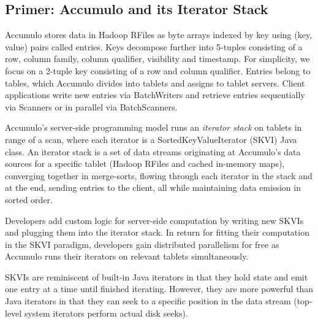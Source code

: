 





\subsection{Primer: Accumulo and its Iterator Stack}
\label{sAccumuloIterators}
Accumulo stores data in Hadoop RFiles as byte arrays indexed by key using (key, value) pairs called entries.
Keys decompose further into 5-tuples consisting of a row, column family, column qualifier, visibility and timestamp.
For simplicity, we focus on a 2-tuple key consisting of a row and column qualifier.
Entries belong to tables, which Accumulo divides into tablets and assigns to tablet servers.
Client applications write new entries via BatchWriters 
and retrieve entries sequentially via Scanners
or in parallel via BatchScanners.

Accumulo's server-side programming model runs an \emph{iterator stack} on tablets in range of a scan, 
where each iterator is a SortedKeyValueIterator (SKVI) Java class.
An iterator stack is a set of data streams originating
at Accumulo's data sources for a specific tablet (Hadoop RFiles and cached in-memory maps), 
converging together in merge-sorts,
flowing through each iterator in the stack and at the end, sending entries to the client,
all while maintaining data emission in sorted order.

Developers add custom logic for server-side computation
by writing new SKVIs and plugging them into the iterator stack.
In return for fitting their computation in the SKVI paradigm, developers gain
distributed parallelism for free as Accumulo runs their iterators on relevant tablets simultaneously.


SKVIs are reminiscent of built-in Java iterators in that they hold state 
and emit one entry at a time until finished iterating.
However, they are more powerful than Java iterators in that they can seek to a specific position
in the data stream (top-level system iterators perform actual disk seeks).

